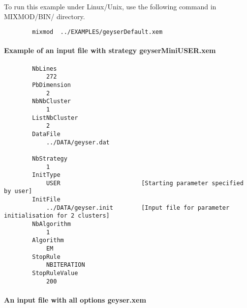 To run this example under Linux/Unix, use the following command in MIXMOD/BIN/ directory.
{\scriptsize
\begin{verbatim}
        mixmod  ../EXAMPLES/geyserDefault.xem
\end{verbatim}}



\paragraph{Example of an input file with strategy geyserMiniUSER.xem }

{\scriptsize
\begin{verbatim}
        NbLines
            272
        PbDimension
            2
        NbNbCluster
            1
        ListNbCluster
            2
        DataFile
            ../DATA/geyser.dat

        NbStrategy
            1
        InitType
            USER                       [Starting parameter specified by user]
        InitFile
            ../DATA/geyser.init        [Input file for parameter initialisation for 2 clusters]
        NbAlgorithm
            1
        Algorithm
            EM
        StopRule
            NBITERATION
        StopRuleValue
            200
\end{verbatim}}



%
%










\paragraph{An input file with all options geyser.xem }


